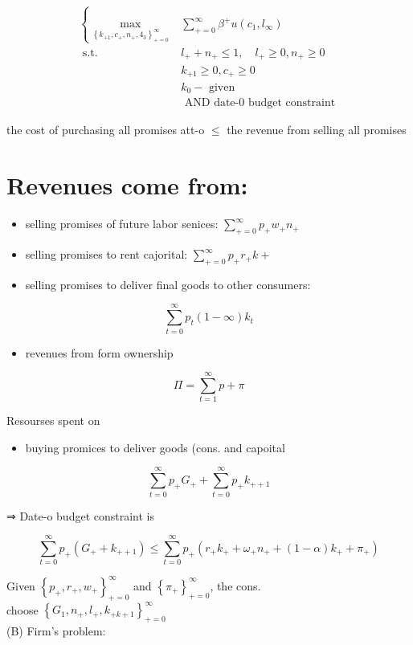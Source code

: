 \documentclass[10pt]{article}
\begin{document}
$$
\begin{aligned}
\left\{\max _{\left\{k_{+1}, c_{+}, n_{+}, 4_{3}\right\}_{+=0}^{\infty}}\right. & \sum_{+=0}^{\infty} \beta^{+} u\left(c_{1}, l_{\infty}\right) \\
\text { s.t. } & l_{+}+n_{+} \leq 1, \quad l_{+} \geq 0, n_{+} \geq 0 \\
& k_{+1} \geq 0, c_{+} \geq 0 \\
& k_{0}-\text { given } \\
& \text { AND date-0 budget constraint }
\end{aligned}
$$

the cost of purchasing all promises att-o $\leq$ the revenue from selling all promises

\section*{Revenues come from:}
\begin{itemize}
  \item selling promises of future labor senices: $\sum_{+=0}^{\infty} p_{+} w_{+} n_{+}$
  \item selling promises to rent cajorital: $\sum_{+=0}^{\infty} p_{+} r_{+} k+$
  \item selling promises to deliver final goods to other consumers:
\end{itemize}

$$
\sum_{t=0}^{\infty} p_{t}(1-\infty) k_{t}
$$

\begin{itemize}
  \item revenues from form ownership
\end{itemize}

$$
\Pi=\sum_{t=1}^{\infty} p+\pi
$$

Resourses spent on

\begin{itemize}
  \item buying promices to deliver goods (cons. and capoital
\end{itemize}

$$
\sum_{t=0}^{\infty} p_{+} G_{+}+\sum_{t=0}^{\infty} p_{+} k_{++1}
$$

⇒ Date-o budget constraint is

$$
\sum_{t=0}^{\infty} p_{+}\left(G_{+}+k_{++1}\right) \leqslant \sum_{t=0}^{\infty} p_{+}\left(r_{+} k_{+}+\omega_{+} n_{+}+(1-\alpha) k_{+}+\pi_{+}\right)
$$

Given $\left\{p_{+}, r_{+}, w_{+}\right\}_{+=0}^{\infty}$ and $\left\{\pi_{+}\right\}_{+=0}^{\infty}$, the cons.\\
choose $\left\{G_{1}, n_{+}, l_{+}, k_{+k+1}\right\}_{+=0}^{\infty}$\\
(B) Firm's problem:
\end{document}

